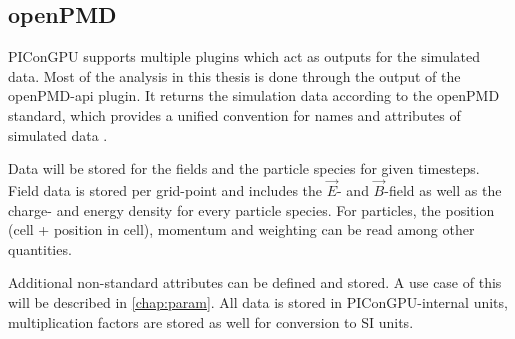 \documentclass[bachelor_thesis]{subfiles}
\begin{document}
\subsection{openPMD}
PIConGPU supports multiple plugins which act as outputs for the simulated data. Most of the analysis in this thesis is done through the output of the openPMD-api \cite{openPMDAPI} plugin.
It returns the simulation data according to the openPMD standard, which provides a unified convention for names and attributes of simulated data \cite{openPMDstandard}.

Data will be stored for the fields and the particle species for given timesteps. Field data is stored per grid-point and includes the $\vec{E}$- and $\vec{B}$-field as well as the charge- and energy density for every particle species.
For particles, the position (cell + position in cell), momentum and weighting can be read among other quantities. 

Additional non-standard attributes can be defined and stored. A use case of this will be described in \autoref{chap:param}. All data is stored in PIConGPU-internal units, multiplication factors are stored as well for conversion to SI units.
\end{document}
